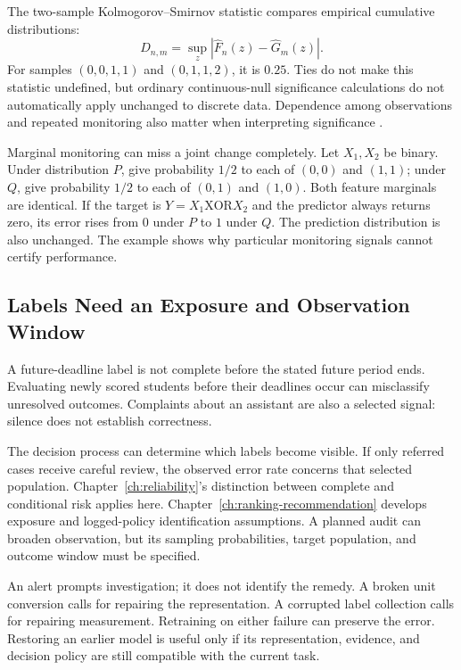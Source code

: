 The two-sample Kolmogorov--Smirnov statistic compares empirical cumulative distributions:
\[
D_{n,m}=\sup_z\left|\widehat F_n(z)-\widehat G_m(z)\right|.
\]
For samples $(0,0,1,1)$ and $(0,1,1,2)$, it is $0.25$. Ties do not make this statistic undefined, but ordinary continuous-null significance calculations do not automatically apply unchanged to discrete data. Dependence among observations and repeated monitoring also matter when interpreting significance \citep{nistKS}.

Marginal monitoring can miss a joint change completely. Let $X_1,X_2$ be binary. Under distribution $P$, give probability $1/2$ to each of $(0,0)$ and $(1,1)$; under $Q$, give probability $1/2$ to each of $(0,1)$ and $(1,0)$. Both feature marginals are identical. If the target is $Y=X_1\mathbin{\mathrm{XOR}}X_2$ and the predictor always returns zero, its error rises from $0$ under $P$ to $1$ under $Q$. The prediction distribution is also unchanged. The example shows why particular monitoring signals cannot certify performance.

\subsection{Labels Need an Exposure and Observation Window}

A future-deadline label is not complete before the stated future period ends. Evaluating newly scored students before their deadlines occur can misclassify unresolved outcomes. Complaints about an assistant are also a selected signal: silence does not establish correctness.

The decision process can determine which labels become visible. If only referred cases receive careful review, the observed error rate concerns that selected population. Chapter~\ref{ch:reliability}'s distinction between complete and conditional risk applies here. Chapter~\ref{ch:ranking-recommendation} develops exposure and logged-policy identification assumptions. A planned audit can broaden observation, but its sampling probabilities, target population, and outcome window must be specified.

An alert prompts investigation; it does not identify the remedy. A broken unit conversion calls for repairing the representation. A corrupted label collection calls for repairing measurement. Retraining on either failure can preserve the error. Restoring an earlier model is useful only if its representation, evidence, and decision policy are still compatible with the current task.

